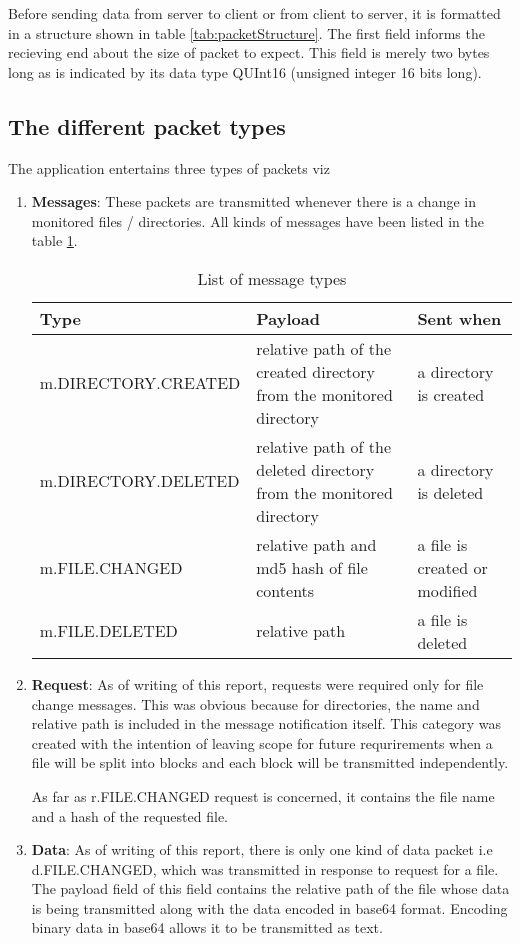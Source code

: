 Before sending data from server to client or from client to server, it is formatted in a structure shown in table \ref{tab:packetStructure}. The first field informs the recieving end about the size of packet to expect.  This field is merely two bytes long as is indicated by its data type QUInt16 (unsigned integer 16 bits long).

\subsection{The different packet types}
The application entertains three types of packets viz
\begin{enumerate}
\item \textbf{Messages}: These packets are transmitted whenever there is a change in monitored files / directories. All kinds of messages have been listed in the table \ref{tab:messageTypes}.
\begin{table}[h]

  \begin{center}
    \begin{tabular} {| l | p{5cm} | l|}
      \hline
      \textbf{Type} & \textbf{Payload} & \textbf{Sent when }\\
      \hline
      m.DIRECTORY.CREATED & relative path of the created directory from the monitored directory& a directory is created\\
      \hline 
      m.DIRECTORY.DELETED & relative path of the deleted directory from the monitored directory & a directory is deleted\\
      \hline
      m.FILE.CHANGED & relative path and md5 hash of file contents & a file is created or modified\\
      \hline
      m.FILE.DELETED & relative path & a file is deleted\\
      \hline
      \end{tabular}
    \caption{List of message types}
    \label{tab:messageTypes}
  \end{center}
\end{table}

\item \textbf{Request}: As of writing of this report, requests were required only for file change messages. This was obvious because for directories, the name and relative path is included in the message notification itself. This category was created with the intention of leaving scope for future requrirements when a file will be split into blocks and each block will be transmitted independently. \par
As far as r.FILE.CHANGED request is concerned, it contains the file name and a hash of the requested file.
\item \textbf{Data}: As of writing of this report, there is only one kind of data packet i.e d.FILE.CHANGED, which was transmitted in response to request for a file. The payload field of this field contains the relative path of the file whose data is being transmitted along with the data encoded in base64 format. Encoding binary data in base64 allows it to be transmitted as text.
\end{enumerate}
